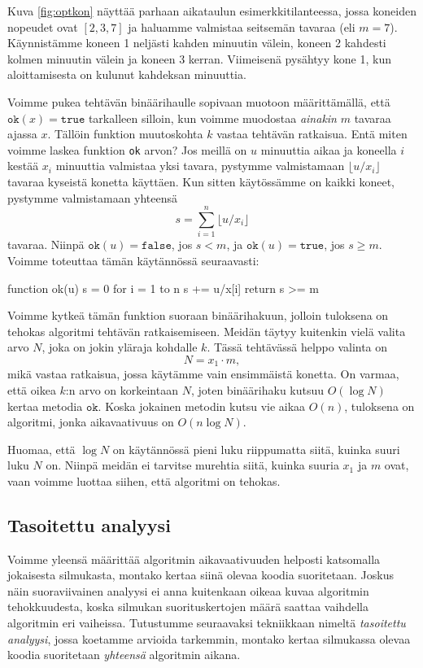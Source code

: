 Kuva \ref{fig:optkon} näyttää parhaan aikataulun esimerkkitilanteessa,
jossa koneiden nopeudet ovat $[2,3,7]$ ja haluamme
valmistaa seitsemän tavaraa (eli $m=7$).
Käynnistämme koneen 1 neljästi kahden minuutin välein,
koneen 2 kahdesti kolmen minuutin välein ja koneen 3 kerran.
Viimeisenä pysähtyy kone 1, kun aloittamisesta
on kulunut kahdeksan minuuttia.

Voimme pukea tehtävän binäärihaulle sopivaan muotoon määrittämällä,
että $\texttt{ok}(x)=\texttt{true}$ tarkalleen silloin, kun voimme muodostaa
\emph{ainakin} $m$ tavaraa ajassa $x$.
Tällöin funktion muutoskohta $k$ vastaa tehtävän ratkaisua.
Entä miten voimme laskea funktion \texttt{ok} arvon?
Jos meillä on $u$ minuuttia aikaa ja koneella $i$ kestää $x_i$
minuuttia valmistaa yksi tavara, pystymme valmistamaan
$\lfloor u/x_i \rfloor$ tavaraa kyseistä konetta käyttäen.
Kun sitten käytössämme on kaikki koneet,
pystymme valmistamaan yhteensä
\[ s = \sum_{i=1}^n \lfloor u/x_i \rfloor \]
tavaraa. Niinpä $\texttt{ok}(u)=\texttt{false}$, jos $s<m$,
ja $\texttt{ok}(u)=\texttt{true}$, jos $s \ge m$.
Voimme toteuttaa tämän käytännössä seuraavasti:

\begin{code}
function ok(u)
    s = 0
    for i = 1 to n
        s += u/x[i]
    return s >= m
\end{code}

Voimme kytkeä tämän funktion suoraan binäärihakuun,
jolloin tuloksena on tehokas algoritmi tehtävän ratkaisemiseen.
Meidän täytyy kuitenkin vielä valita arvo $N$,
joka on jokin yläraja kohdalle $k$.
Tässä tehtävässä helppo valinta on
\[N = x_1 \cdot m,\]
mikä vastaa ratkaisua, jossa käytämme vain ensimmäistä konetta.
On varmaa, että oikea $k$:n arvo on korkeintaan $N$,
joten binäärihaku kutsuu $O(\log N)$ kertaa metodia $\texttt{ok}$.
Koska jokainen metodin kutsu vie aikaa $O(n)$,
tuloksena on algoritmi, jonka aikavaativuus on $O(n \log N)$.

Huomaa, että $\log N$ on käytännössä pieni luku riippumatta
siitä, kuinka suuri luku $N$ on.
Niinpä meidän ei tarvitse murehtia siitä,
kuinka suuria $x_1$ ja $m$ ovat,
vaan voimme luottaa siihen, että algoritmi on tehokas.

\subsection{Tasoitettu analyysi}

Voimme yleensä määrittää algoritmin aikavaativuuden
helposti katsomalla jokaisesta silmukasta,
montako kertaa siinä olevaa koodia suoritetaan.
Joskus näin suoraviivainen analyysi ei anna kuitenkaan
oikeaa kuvaa algoritmin tehokkuudesta,
koska silmukan suorituskertojen määrä saattaa vaihdella
algoritmin eri vaiheissa.
Tutustumme seuraavaksi tekniikkaan nimeltä
\emph{tasoitettu analyysi}, jossa koetamme arvioida tarkemmin,
montako kertaa silmukassa olevaa koodia suoritetaan
\emph{yhteensä} algoritmin aikana.

